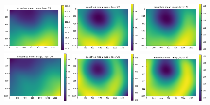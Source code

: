 \documentclass[letterpaper,11pt]{article}
\begin{document}
\begin{figure}[!ht]
\includegraphics[width=0.32\textwidth]{images/results/smoothed_mean_image_layers_vectra/smoothed_mean_image_layer_19}
\includegraphics[width=0.32\textwidth]{images/results/smoothed_mean_image_layers_vectra/smoothed_mean_image_layer_22}
\includegraphics[width=0.32\textwidth]{images/results/smoothed_mean_image_layers_vectra/smoothed_mean_image_layer_25}
\includegraphics[width=0.32\textwidth]{images/results/smoothed_mean_image_layers_vectra/smoothed_mean_image_layer_26}
\includegraphics[width=0.32\textwidth]{images/results/smoothed_mean_image_layers_vectra/smoothed_mean_image_layer_29}
\includegraphics[width=0.32\textwidth]{images/results/smoothed_mean_image_layers_vectra/smoothed_mean_image_layer_32}

\end{figure}
\end{document}

